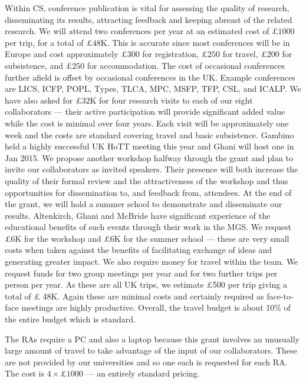 \documentclass[a4paper,11pt]{article}
\begin{document}
 Within CS, conference publication is
vital for assessing the quality of research, disseminating its
results, attracting feedback and keeping abreast of the related
research.  We will attend two conferences per year at an estimated
cost of $\pounds 1000$ per trip, for a total of $\pounds
48$K. This is accurate since most conferences will
be in Europe and cost approximately $\pounds 300$ for registration,
$\pounds 250$ for travel, $\pounds 200$ for subsistence, and $\pounds
250$ for accommodation. The cost of occasional conferences further
afield is offset by occasional conferences in the UK. Example
conferences are LICS, ICFP, POPL, Types, TLCA, MPC, MSFP, TFP, CSL,
and ICALP.  We have also asked for $\pounds 32$K for four research visits
to each of our eight collaborators --- their active participation will
provide significant added value while the cost is minimal 
over four years. Each visit will be approximately one week and the costs
are standard covering travel and basic subsistence. Gambino held a
highly successful UK HoTT meeting this year and Ghani will host
one in Jan 2015. We propose another workshop halfway through the
grant and plan to invite our collaborators as invited speakers.
Their presence will both increase the quality of their
formal review and the attractiveness of the
workshop and thus opportunities for dissemination to, and feedback
from, attendees. At the end of the grant, we will hold a summer school
to demonstrate and disseminate our results. Altenkirch, Ghani and
McBride have significant experience of the educational benefits of
such events through their work in the MGS. We request \pounds 6K for
the workshop and \pounds 6K for the summer school --- these are very
small costs when taken against the benefits of facilitating exchange
of ideas and generating greater impact. We also require money for
travel within the team. We request funds for two group meetings per year
and for two further trips per person per year. As these are all UK
trips, we estimate \pounds 500 per trip giving a total of \pounds
48K. Again these are minimal costs and certainly required as
face-to-face meetings are highly productive. Overall, the travel
budget is about 10\% of the entire budget which is standard.

\vspace{0.02in}

 The RAs require a PC and also a
laptop because this grant involves an unusually large amount of travel to take
advantage of the input of our collaborators. These are not provided by
our universities and so one each is requested for each RA. The cost is
$4\times\pounds1000$ --- an entirely standard
pricing. 
\end{document}
